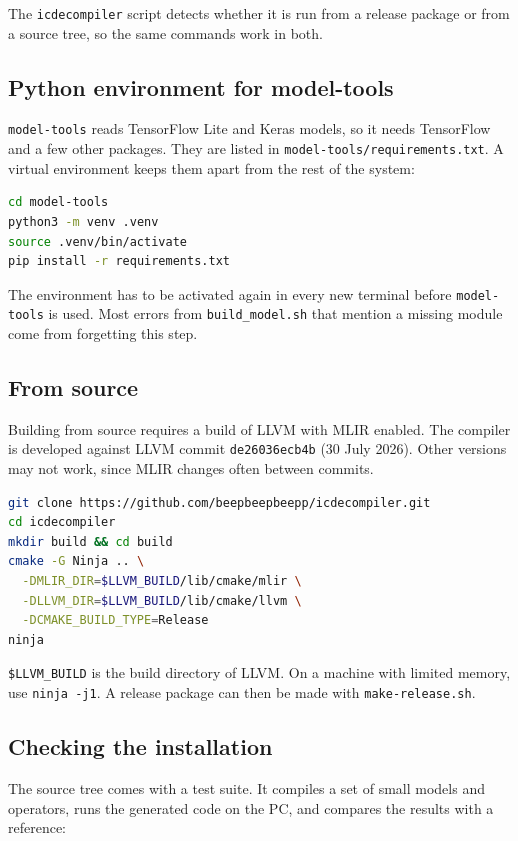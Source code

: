 \documentclass[11pt,a4paper]{article}
\begin{document}
The \texttt{icdecompiler} script detects whether it is run from a release
package or from a source tree, so the same commands work in both.

\subsection{Python environment for model-tools}

\texttt{model-tools} reads TensorFlow Lite and Keras models, so it needs
TensorFlow and a few other packages. They are listed in
\texttt{model-tools/requirements.txt}. A virtual environment keeps them apart
from the rest of the system:

\begin{lstlisting}[language=bash]
cd model-tools
python3 -m venv .venv
source .venv/bin/activate
pip install -r requirements.txt
\end{lstlisting}

The environment has to be activated again in every new terminal before
\texttt{model-tools} is used. Most errors from \texttt{build\_model.sh} that
mention a missing module come from forgetting this step.

\subsection{From source}

Building from source requires a build of LLVM with MLIR enabled. The compiler
is developed against LLVM commit \texttt{de26036ecb4b} (30 July 2026). Other
versions may not work, since MLIR changes often between commits.

\begin{lstlisting}[language=bash]
git clone https://github.com/beepbeepbeepp/icdecompiler.git
cd icdecompiler
mkdir build && cd build
cmake -G Ninja .. \
  -DMLIR_DIR=$LLVM_BUILD/lib/cmake/mlir \
  -DLLVM_DIR=$LLVM_BUILD/lib/cmake/llvm \
  -DCMAKE_BUILD_TYPE=Release
ninja
\end{lstlisting}

\texttt{\$LLVM\_BUILD} is the build directory of LLVM. On a machine with
limited memory, use \texttt{ninja -j1}. A release package can then be made
with \texttt{make-release.sh}.

\subsection{Checking the installation}

The source tree comes with a test suite. It compiles a set of small models and
operators, runs the generated code on the PC, and compares the results with a
reference:
\end{document}
